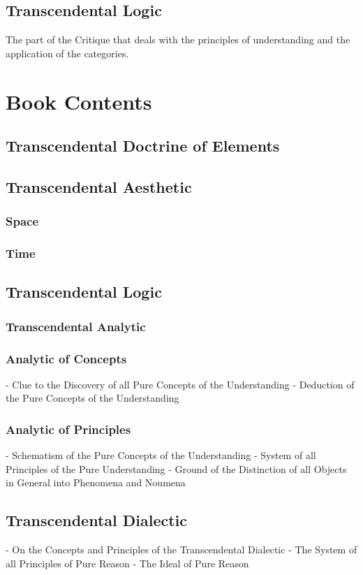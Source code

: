 \documentclass[a4paper]{article}
\begin{document}
\subsection{Transcendental Logic}
The part of the Critique that deals with the principles of understanding and the application of the categories.


\section{Book Contents}
\subsection{Transcendental Doctrine of Elements}
\subsection{Transcendental Aesthetic}
\subsubsection{Space}
\subsubsection{Time}

\subsection{Transcendental Logic}
\subsubsection{Transcendental Analytic}
\subsubsection{Analytic of Concepts}
- Clue to the Discovery of all Pure Concepts of the Understanding
- Deduction of the Pure Concepts of the Understanding

\subsubsection{Analytic of Principles}
- Schematism of the Pure Concepts of the Understanding
- System of all Principles of the Pure Understanding
- Ground of the Distinction of all Objects in General into Phenomena and Noumena

\subsection{Transcendental Dialectic}
- On the Concepts and Principles of the Transcendental Dialectic
- The System of all Principles of Pure Reason
- The Ideal of Pure Reason
\end{document}
